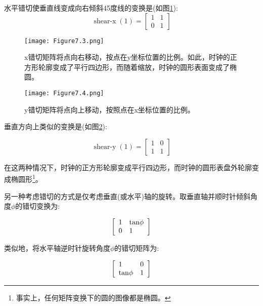 \begin{example}
	水平错切使垂直线变成向右倾斜45度线的变换是(如图\ref{fig:7.3}):
	\begin{equation}
		\operatorname{shear-x}(1)=\left[\begin{array}{ll}
			1 & 1 \\
			0 & 1
		\end{array}\right]
		\nonumber
	\end{equation}

\begin{figure}[htbp]
	\centering
	\texttt{[image: Figure7.3.png]}
	\caption{x错切矩阵将点向右移动，按点在y坐标位置的比例。如此，时钟的正方形轮廓变成了平行四边形，而随着缩放，时钟的圆形表面变成了椭圆。}
	\label{fig:7.3}
\end{figure}
	
\begin{figure}[htbp]
	\centering
	\texttt{[image: Figure7.4.png]}
	\caption{y错切矩阵将点向上移动，按照点在x坐标位置的比例。}
	\label{fig:7.4}
\end{figure}	
	
	垂直方向上类似的变换是(如图\ref{fig:7.4}):
	
	\begin{equation}
		\operatorname{shear-y}(1)=\left[\begin{array}{ll}
			1 & 0 \\
			1 & 1
		\end{array}\right]
		\nonumber
	\end{equation}
	
	在这两种情况下，时钟的正方形轮廓变成平行四边形，而时钟的圆形表盘外轮廓变成椭圆形\footnote{事实上，任何矩阵变换下的圆的图像都是椭圆。}。
	
	另一种考虑错切的方式是仅考虑垂直(或水平)轴的旋转。取垂直轴并顺时针倾斜角度$\phi$的错切变换为:
	
	\begin{equation}
		\left[\begin{array}{ll}
			1 &  \rm tan \phi \\
			0 & 1
		\end{array}\right]
		\nonumber
	\end{equation}

	类似地，将水平轴逆时针旋转角度$\phi$的错切矩阵为:
	
	\begin{equation}
		\left[\begin{array}{ll}
			1 &  0 \\
			\rm tan \phi & 1
		\end{array}\right]
		\nonumber
	\end{equation}
	
\end{example}

